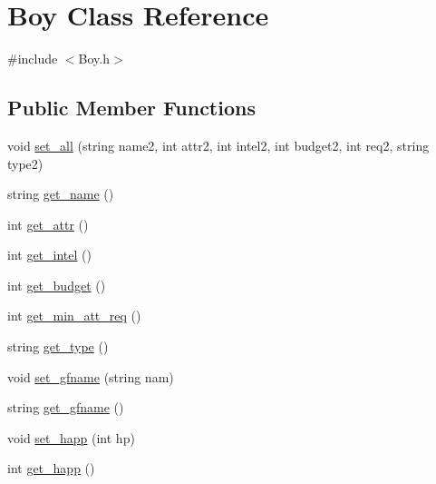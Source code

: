 \hypertarget{classBoy}{}\section{Boy Class Reference}
\label{classBoy}


{\ttfamily \#include $<$Boy.\+h$>$}

\subsection*{Public Member Functions}
\begin{DoxyCompactItemize}
\item 
void \hyperlink{classBoy_a4a2303961bc7e23c2e19a4781277d088}{set\+\_\+all} (string name2, int attr2, int intel2, int budget2, int req2, string type2)
\item 
string \hyperlink{classBoy_a38e4b40846c88387e33eabdb7cfda958}{get\+\_\+name} ()
\item 
int \hyperlink{classBoy_a37fb6a59cc1471410759526dcf2abb06}{get\+\_\+attr} ()
\item 
int \hyperlink{classBoy_ae3cfbdc28b8cad1e6bdc8f06e49e6903}{get\+\_\+intel} ()
\item 
int \hyperlink{classBoy_a32916b400448215ba0c4ad8e1061def9}{get\+\_\+budget} ()
\item 
int \hyperlink{classBoy_acd81d7c6e595d05d5a25b9a9b6c3345b}{get\+\_\+min\+\_\+att\+\_\+req} ()
\item 
string \hyperlink{classBoy_ac3bb7d0ef3638d92e64d71809a84ebaa}{get\+\_\+type} ()
\item 
void \hyperlink{classBoy_ac9140aff9675e4e4a2cd2980d65ab0ca}{set\+\_\+gfname} (string nam)
\item 
string \hyperlink{classBoy_a468063de535334e0174fc87a803cd925}{get\+\_\+gfname} ()
\item 
void \hyperlink{classBoy_a35d39276b1dd950d952901c7aa4176b9}{set\+\_\+happ} (int hp)
\item 
int \hyperlink{classBoy_ad6ef5e1b1743304b61080a0e1ffda56f}{get\+\_\+happ} ()
\end{DoxyCompactItemize}
